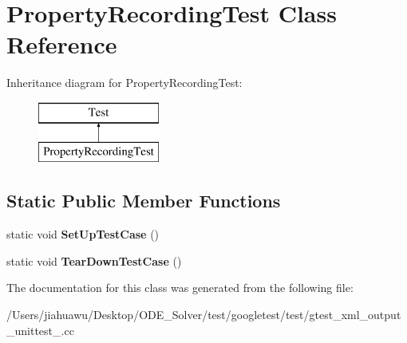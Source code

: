 \hypertarget{class_property_recording_test}{}\section{Property\+Recording\+Test Class Reference}
\label{class_property_recording_test}
Inheritance diagram for Property\+Recording\+Test\+:\begin{figure}[H]
\begin{center}
\leavevmode
\includegraphics[height=2.000000cm]{class_property_recording_test}
\end{center}
\end{figure}
\subsection*{Static Public Member Functions}
\begin{DoxyCompactItemize}
\item 
\mbox{\label{class_property_recording_test_a673c9dfcd9f0c8d10d0df765852c1669}} 
static void {\bfseries Set\+Up\+Test\+Case} ()
\item 
\mbox{\label{class_property_recording_test_ac0d2d47efbdc4399777dffca6071d15d}} 
static void {\bfseries Tear\+Down\+Test\+Case} ()
\end{DoxyCompactItemize}


The documentation for this class was generated from the following file\+:\begin{DoxyCompactItemize}
\item 
/\+Users/jiahuawu/\+Desktop/\+O\+D\+E\+\_\+\+Solver/test/googletest/test/gtest\+\_\+xml\+\_\+output\+\_\+unittest\+\_\+.\+cc\end{DoxyCompactItemize}
